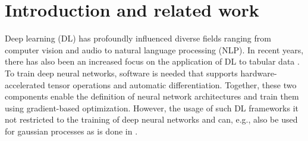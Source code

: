 \documentclass[article]{jss}
\theoremstyle{definition}
\begin{document}
\begin{comment}
Non-text TODOs:

\begin{itemize}
    \item [ ] I should provide all the documentation as part of the mlr3 book before submission
    \item [ ] ensure that caching is enabled in code because otherwise temp directory might be deleted for the melanoma dataset on linux
    \item [ ] Check that networks / learners that are not trained here still can be trained and are correctly constructed
    \item [ ] check that everything is working (like created callback) when it is not explicitly run in the code
    \item [ ] Should include JIT-improvements in torch and make a release, otherwise benchmark result is a little misleading
\end{itemize}

Text TODOs:

\begin{itemize}
    \item Appendix: What should be there? And if we add it there, reference it in the main text.
    \item Upkeep with mlr3torch: different output dim
\end{itemize}

\end{comment}

%
%
%
%
%

\section{Introduction and related work}

Deep learning (DL) has profoundly influenced diverse fields ranging from computer vision and audio to natural language processing (NLP).
In recent years, there has also been an increased focus on the application of DL to tabular data \citep{ref-borisov2022deep}.
To train deep neural networks, software is needed that supports hardware-accelerated tensor operations and automatic differentiation.
Together, these two components enable the definition of neural network architectures and train them using gradient-based optimization.
However, the usage of such DL frameworks it not restricted to the training of deep neural networks and can, e.g., also be used for gaussian processes as is done in  \citep{gardner2018gpytorch}.
\end{document}
